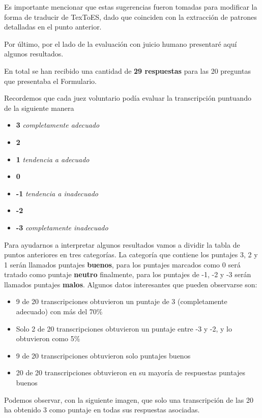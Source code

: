 Es importante mencionar que estas sugerencias fueron tomadas para modificar la forma de traducir de TexToES, dado que coinciden con la extracción de patrones detalladas en el punto anterior.

Por último, por el lado de la evaluación con juicio humano presentaré aquí algunos resultados.

En total se han recibido una cantidad de \textbf{29 respuestas} para las 20 preguntas que presentaba el Formulario.

Recordemos que cada juez voluntario podía evaluar la transcripción puntuando de la siguiente manera

\begin{itemize}
   \item \textbf{3} \textit{completamente adecuado}
   \item \textbf{2}
   \item \textbf{1} \textit{tendencia a adecuado}
   \item \textbf{0}
   \item \textbf{-1} \textit{tendencia a inadecuado}
   \item \textbf{-2}
   \item \textbf{-3} \textit{completamente inadecuado}
\end{itemize}

Para ayudarnos a interpretar algunos resultados vamos a dividir la tabla de puntos anteriores en tres categorías. La categoría que contiene los puntajes 3, 2 y 1 serán llamados puntajes \textbf{buenos}, para los puntajes marcados como 0 será tratado como puntaje \textbf{neutro} finalmente, para los puntajes de -1, -2 y -3 serán llamados puntajes \textbf{malos}.
Algunos datos interesantes que pueden observarse son:

\begin{itemize}
   \item 9 de 20 transcripciones obtuvieron un puntaje de 3 (completamente adecuado) con más del 70\%
   \item Solo 2 de 20 transcripciones obtuvieron un puntaje entre -3 y -2, y lo obtuvieron como 5\%
   \item 9 de 20 transcripciones obtuvieron solo puntajes buenos
   \item 20 de 20 transcripciones obtuvieron en su mayoría de respuestas puntajes buenos
\end{itemize}

Podemos observar, con la siguiente imagen, que solo una transcripción de las 20 ha obtenido 3 como puntaje en todas sus respuestas asociadas.

